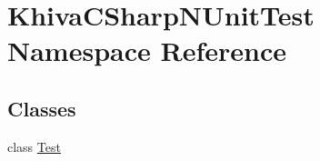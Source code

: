 \hypertarget{namespace_khiva_c_sharp_n_unit_test}{}\section{Khiva\+C\+Sharp\+N\+Unit\+Test Namespace Reference}
\label{namespace_khiva_c_sharp_n_unit_test}
\subsection*{Classes}
\begin{DoxyCompactItemize}
\item 
class \mbox{\hyperlink{class_khiva_c_sharp_n_unit_test_1_1_test}{Test}}
\end{DoxyCompactItemize}
